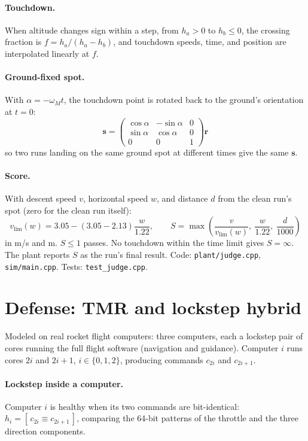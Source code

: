 \documentclass[11pt]{article}
\begin{document}
\paragraph{Touchdown.} When altitude changes sign within a step, from $h_a > 0$ to
$h_b \le 0$, the crossing fraction is $f = h_a / (h_a - h_b)$, and touchdown speeds,
time, and position are interpolated linearly at $f$.

\paragraph{Ground-fixed spot.} With $\alpha = -\omega_M t$, the touchdown point is rotated
back to the ground's orientation at $t = 0$:
\begin{equation}
\mathbf{s} = \begin{pmatrix}\cos\alpha & -\sin\alpha & 0\\ \sin\alpha & \cos\alpha & 0\\ 0&0&1\end{pmatrix}\mathbf{r}
\end{equation}
so two runs landing on the same ground spot at different times give the same $\mathbf{s}$.

\paragraph{Score.} With descent speed $v$, horizontal speed $w$, and distance $d$ from the
clean run's spot (zero for the clean run itself):
\begin{equation}
v_{\lim}(w) = 3.05 - (3.05 - 2.13)\frac{w}{1.22}, \qquad
S = \max\left(\frac{v}{v_{\lim}(w)},\ \frac{w}{1.22},\ \frac{d}{1000}\right)
\end{equation}
in m/s and m. $S \le 1$ passes. No touchdown within the time limit gives
$S = \infty$. The plant reports $S$ as the run's final result.
Code: \texttt{plant/judge.cpp}, \texttt{sim/main.cpp}. Tests: \texttt{test\_judge.cpp}.

\section{Defense: TMR and lockstep hybrid}
Modeled on real rocket flight computers: three computers, each a lockstep pair of cores
running the full flight software (navigation and guidance). Computer $i$ runs cores $2i$
and $2i+1$, $i \in \{0,1,2\}$, producing commands $c_{2i}$ and $c_{2i+1}$.

\paragraph{Lockstep inside a computer.} Computer $i$ is healthy when its two commands are
bit-identical: $h_i = [\,c_{2i} \equiv c_{2i+1}\,]$, comparing the 64-bit patterns of the
throttle and the three direction components.
\end{document}
